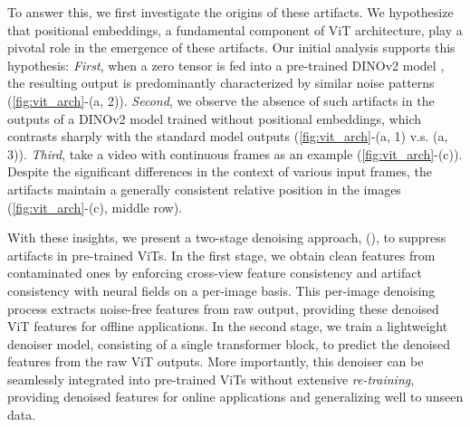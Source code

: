 To answer this, we first investigate the origins of these artifacts. We hypothesize that positional embeddings, a fundamental component of ViT architecture, play a pivotal role in the emergence of these artifacts. Our initial analysis supports this hypothesis: \textit{First}, when a zero tensor is fed into a pre-trained DINOv2 model \cite{oquab2023dinov2}, the resulting output is predominantly characterized by similar noise patterns (\cref{fig:vit_arch}-(a, 2)). \textit{Second}, we observe the absence of such artifacts in the outputs of a DINOv2 model trained without positional embeddings,  which contrasts sharply with the standard model outputs (\cref{fig:vit_arch}-(a, 1) v.s. (a, 3)).
\textit{Third}, take a video with continuous frames as an example (\cref{fig:vit_arch}-(c)). Despite the significant differences in the context of various input frames, the artifacts maintain a generally consistent relative position in the images (\cref{fig:vit_arch}-(c), middle row).



With these insights, we present a two-stage denoising approach, \ourslong (\ours), to suppress artifacts in pre-trained ViTs. In the first stage, we obtain clean features from contaminated ones by enforcing cross-view feature consistency and artifact consistency with neural fields on a per-image basis. This per-image denoising process extracts noise-free features from raw output, providing these denoised ViT features for offline applications. In the second stage, we train a lightweight denoiser model, consisting of a single transformer block, to predict the denoised features from the raw ViT outputs. More importantly, this denoiser can be seamlessly integrated into pre-trained ViTs without extensive \textit{re-training}, providing denoised features for online applications and generalizing well to unseen data.




